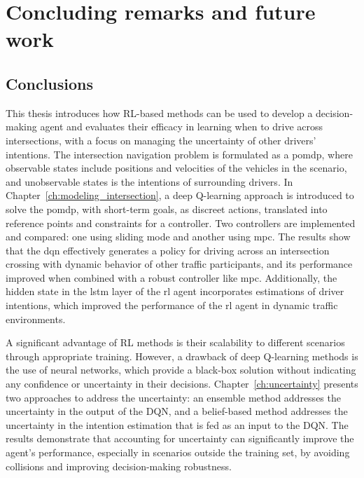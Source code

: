 \chapter{Concluding remarks and future work}


\section{Conclusions}\label{ch:conclusion}
This thesis introduces how RL-based methods can be used to develop a decision-making agent and evaluates their efficacy in learning when to drive across intersections, with a focus on managing the uncertainty of other drivers' intentions. The intersection navigation problem is formulated as a \gls{pomdp}, where observable states include positions and velocities of the vehicles in the scenario, and unobservable states is the intentions of surrounding drivers. 
In Chapter~\ref{ch:modeling_intersection}, a deep Q-learning approach is introduced to solve the \gls{pomdp}, with short-term goals, as discreet actions, translated into reference points and constraints for a controller. Two controllers are implemented and compared: one using sliding mode and another using \gls{mpc}. The results show that the \gls{dqn} effectively generates a policy for driving across an intersection crossing with dynamic behavior of other traffic participants, and its performance improved when combined with a robust controller like \gls{mpc}.  
Additionally, the hidden state in the \gls{lstm} layer of the \gls{rl} agent incorporates estimations of driver intentions, which improved the performance of the \gls{rl} agent in dynamic traffic environments.

A significant advantage of RL methods is their scalability to different scenarios through appropriate training. However, a drawback of deep Q-learning methods is the use of neural networks, which provide a black-box solution without indicating any confidence or uncertainty in their decisions. Chapter~\ref{ch:uncertainty} presents two approaches to address the uncertainty: an ensemble method addresses the uncertainty in the output of the DQN, and a belief-based method addresses the uncertainty in the intention estimation that is fed as an input to the DQN. The results demonstrate that accounting for uncertainty can significantly improve the agent's performance, especially in scenarios outside the training set, by avoiding collisions and improving decision-making robustness.

